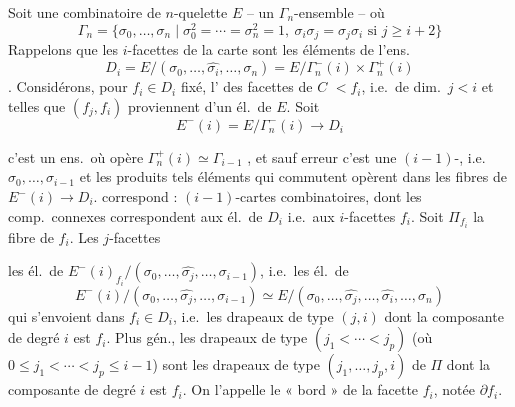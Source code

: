 \documentclass[11pt,a4paper]{article}
\begin{document}
Soit \struck{\ill{}} une  combinatoire  de $n$-quelette $E$ -- un $\Gamma_n$-ensemble -- où
\[
\Gamma_n = \{\sigma_0, \dots, \sigma_n \mid \sigma_0^2 = \cdots = \sigma_n^2 = 1,\ \sigma_i\sigma_j = \sigma_j\sigma_i \text{ si } j\ge i+2\}
\]
Rappelons que les $i$-facettes de la carte sont les éléments de l'ens.
\[
D_i = E/(\sigma_0, \dots, \widehat{\sigma_i}, \dots, \sigma_n) = E/\Gamma_n^{-}(i)\times\Gamma_n^{+}(i)
\]
.
Considérons, pour $f_i \in D_i$ fixé, l' des facettes  de $C$  $< f_i$, \struck{\ill{}} i.e.\ de dim.\ $j < i$ et telles que $(f_j, f_i)$ proviennent d'un él.\ de $E$. Soit 
\[
E^{-}(i) = E/\Gamma_n^{-}(i) \longrightarrow D_i
\]
 \struck{\ill{}}

c'est un ens.\ où opère $\Gamma_n^{+}(i) \simeq \Gamma_{i-1}$ , et sauf erreur c'est une $(i-1)$-, \add{\uncertain{\ill{}}} i.e.\ $\sigma_0, \dots, \sigma_{i-1}$ et les produits  tels éléments qui commutent opèrent dans les fibres de $E^{-}(i) \to D_i$.   correspond : \struck{\ill{}} \struck{\ill{}} $(i-1)$-cartes combinatoires, dont les comp.\ connexes correspondent aux él.\ de $D_i$ i.e.\ aux $i$-facettes $f_i$. Soit  $\Pi_{f_i}$ la fibre de $f_i$. Les $j$-facettes 

les él.\ de $E^{-}(i)_{f_i} / (\sigma_0, \dots, \widehat{\sigma_j}, \dots, \sigma_{i-1})$, i.e.\ les él.\ de
\[
E^{-}(i)/(\sigma_0, \dots, \widehat{\sigma_j}, \dots, \sigma_{i-1}) \simeq E/(\sigma_0, \dots, \widehat{\sigma_j}, \dots, \widehat{\sigma_i}, \dots, \sigma_n)
\]
qui  s'envoient dans $f_i \in D_i$, i.e.\ les drapeaux de type $(j, i)$ dont la composante de degré  $i$ est $f_i$. Plus gén., les drapeaux de type $(j_1 < \cdots < j_p)$ (où $0\le j_1 < \cdots < j_p \le i-1$) sont les drapeaux de type $(j_1, \dots, j_p, i)$ de $\Pi$ \struck{\ill{}} dont la composante de degré $i$ est $f_i$. On l'appelle  le « bord » de la facette $f_i$, notée $\partial f_i$.
\end{document}
